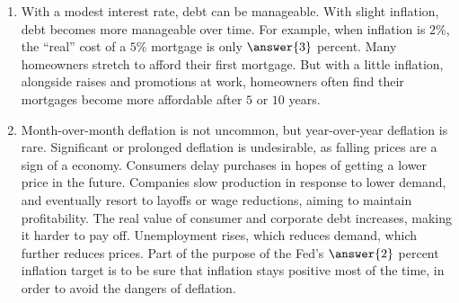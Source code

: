 \documentclass{ximera}
\begin{document}
\begin{question}
\begin{question}
\begin{enumerate}
\item With a modest interest rate, debt can be manageable.  With slight inflation, debt becomes more manageable over time.  For example, when inflation is $2\%$, the ``real'' cost of a $5\%$ mortgage is only $\answer{3}$ percent.  Many homeowners stretch to afford their first mortgage.  But with a little inflation, alongside raises and promotions at work, homeowners often find their mortgages become more affordable after $5$ or $10$ years.  

\item Month-over-month deflation is not uncommon, but year-over-year deflation is rare. Significant or prolonged deflation is undesirable, as falling prices are a sign of a 
 economy.  Consumers delay purchases in hopes of getting a lower price in the future.  Companies slow production in response to lower demand, and eventually resort to layoffs or wage reductions, aiming to maintain profitability.  The real value of consumer and corporate debt increases, making it harder to pay off.  Unemployment rises, which reduces demand, which further reduces prices.  Part of the purpose of the Fed's $\answer{2}$ percent inflation target is to be sure that inflation stays positive most of the time, in order to avoid the dangers of deflation.   
\end{enumerate}

%

\end{question}
\end{question}
\end{document}
